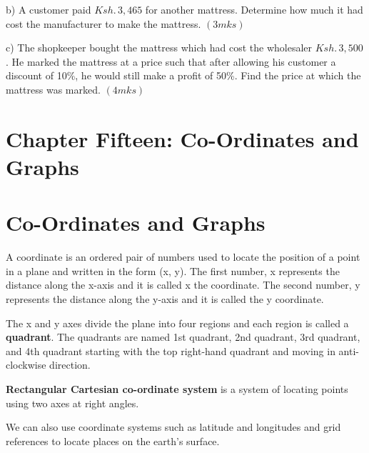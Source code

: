 \documentclass[
  a4paperpaper,
]{scrbook}
\begin{document}
\begin{tcolorbox}
\begin{enumerate}
  b) A customer paid \(Ksh.\, 3,465\) for another mattress. Determine
  how much it had cost the manufacturer to make the mattress.
  \hspace{8.2cm} \((3mks)\)

  c) The shopkeeper bought the mattress which had cost the wholesaler
  \(Ksh.\, 3,500\). He marked the mattress at a price such that after
  allowing his customer a discount of 10\%, he would still make a profit
  of 50\%. Find the price at which the mattress was marked.\hspace{1cm}
  \((4mks)\)
\end{enumerate}

\end{tcolorbox}


\hypertarget{chapter-fifteen-co-ordinates-and-graphs}{%
\chapter{Chapter Fifteen: Co-Ordinates and
Graphs}\label{chapter-fifteen-co-ordinates-and-graphs}}


\hypertarget{co-ordinates-and-graphs}{%
\chapter*{Co-Ordinates and Graphs}\label{co-ordinates-and-graphs}}


A coordinate is an ordered pair of numbers used to locate the position
of a point in a plane and written in the form (x, y). The first number,
x represents the distance along the x-axis and it is called x the
coordinate. The second number, y represents the distance along the
y-axis and it is called the y coordinate.

The x and y axes divide the plane into four regions and each region is
called a \textbf{quadrant}. The quadrants are named 1st quadrant, 2nd
quadrant, 3rd quadrant, and 4th quadrant starting with the top
right-hand quadrant and moving in anti-clockwise direction.

\textbf{Rectangular Cartesian co-ordinate system} is a system of
locating points using two axes at right angles.

We can also use coordinate systems such as latitude and longitudes and
grid references to locate places on the earth's surface.
\end{document}
